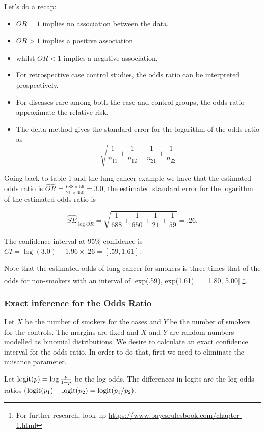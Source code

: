 \documentclass{homework}
\begin{document}
Let's do a recap:

\begin{itemize}
    \item $OR=1$ implies no association between the data, 
    \item $OR >1$ implies a positive association
    \item whilst $OR < 1$ implies a negative association. 
    \item For retrospective case control studies, the odds ratio can be interpreted prospectively.
    \item For diseases rare among both the case and control groups, the odds ratio approximate the relative risk.
    \item The delta method gives the standard error for the logarithm of the odds ratio as 
    $$
    \sqrt{\frac{1}{n_{11}}+\frac{1}{n_{12}}+\frac{1}{n_{21}}+\frac{1}{n_{22}}}
    $$
\end{itemize}

Going back to table 1 and the lung cancer example we have that the estimated odds ratio is $\hat{OR}= \frac{688 \times 59}{21 \times 650} = 3.0$, the estimated standard error for the logarithm of the estimated odds ratio is 

$$
\hat{SE}_{\log \hat{OR}} = \sqrt{\frac{1}{688}+\frac{1}{650}+\frac{1}{21}+\frac{1}{59}} = .26.
$$

The confidence interval at 95\% confidence is $CI= \log(3.0) \pm 1.96 \times .26 = [.59, 1.61]$.

Note that the estimated odds of lung cancer for smokers is three times that of the odds for non-smokers with an interval of [exp(.59), exp(1.61)] = [1.80, 5.00] \footnote{For further research, look up \url{https://www.bayesrulesbook.com/chapter-1.html}}.

\subsubsection{Exact inference for the Odds Ratio}

Let $X$ be the number of smokers for the cases and $Y$ be the number of smokers for the controls. The margins are fixed and $X$ and $Y$ are random numbers modelled as binomial distributions. We desire to calculate an exact confidence interval for the odds ratio. In order to do that, first we need to eliminate the nuisance parameter. 

Let $\textnormal{logit}(p)=\log\frac{p}{1-p}$ be the log-odds. The differences in logits are the log-odds ratios ($\textnormal{logit}(p_1) -\textnormal{logit}(p_2) = \textnormal{logit}(p_1/p_2) $.
\end{document}
